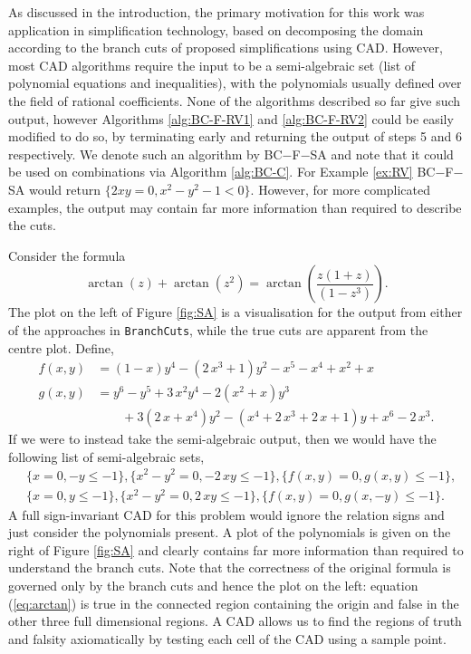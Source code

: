 \documentclass{llncs}
\begin{document}
As discussed in the introduction, the primary motivation for this work was application in simplification technology, based on decomposing the domain according to the branch cuts of proposed simplifications using CAD.  However, most CAD algorithms require the input to be a semi-algebraic set (list of polynomial equations and inequalities), with the polynomials usually defined over the field of rational coefficients.  None of the algorithms described so far give such output, however Algorithms \ref{alg:BC-F-RV1} and \ref{alg:BC-F-RV2} could be easily modified to do so, by terminating early and returning the output of steps 5 and 6 respectively.  We denote such an algorithm by BC$-$F$-$SA and note that it could be used on combinations via Algorithm \ref{alg:BC-C}.  
For Example \ref{ex:RV} BC$-$F$-$SA would return $\{2xy = 0, x^2-y^2-1 < 0\}$.  However, for more complicated examples, the output may contain far more information than required to describe the cuts.

\begin{example}
\label{ex:SA}
Consider the formula 
\begin{equation}
\label{eq:arctan}
\arctan(z) + \arctan(z^2) = \arctan \left( \frac{z(1+z)}{(1-z^3)} \right).
\end{equation}
The plot on the left of Figure \ref{fig:SA} is a visualisation for the output from either of the approaches in \texttt{BranchCuts}, while the true cuts are apparent from the centre plot.
Define, 
\begin{align*} 
f(x,y) &= \left( 1-x \right) {y}^{4} - \left( 2\,{x}^{3}+1 \right) {y}^{2} - {x}^{5} - {x}^{4} + {x}^{2} + x \\
g(x,y) &= {y}^{6} - {y}^{5} + 3\,{x}^{2}{y}^{4} - 2\left( {x}^{2} + x \right){y}^{3} 
\\ &\qquad 
+ 3\left( 2\,x+{x}^{4} \right){y}^{2} - \left( {x}^{4} + 2\,{x}^{3} +2\,x + 1 \right)y + {x}^{6} - 2\,{x}^{3}.
\end{align*}
If we were to instead take the semi-algebraic output, then we would have the following list of semi-algebraic sets,
\begin{align*}
&\{x=0,-y\leq -1\}, \{ {x}^{2}-{y}^{2}=0,-2\,xy\leq -1\}, \{f(x,y)=0,  g(x,y) \leq -1\},  \\
&\{x=0, y\leq -1\}, \{ {x}^{2}-{y}^{2}=0, 2\,xy\leq -1\}, \{f(x,y)=0, g(x,-y) \leq -1\}.
\end{align*}
A full sign-invariant CAD for this problem would ignore the relation signs and just consider the polynomials present.  A plot of the polynomials is given on the right of Figure \ref{fig:SA} and clearly contains far more information than required to understand the branch cuts.  Note that the correctness of the original formula is governed only by the branch cuts and hence the plot on the left: equation (\ref{eq:arctan}) is true in the connected region containing the origin and false in the other three full dimensional regions.  A CAD allows us to find the regions of truth and falsity axiomatically by testing each cell of the CAD using a sample point.
\end{example}
\end{document}
